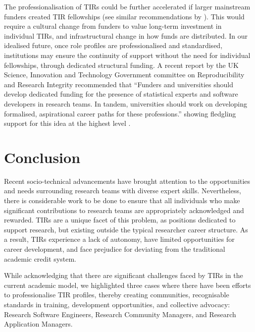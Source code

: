 \documentclass[authordate,meta,issue]{jote-new-article}
\begin{document}
The professionalisation of TIRs could be further accelerated if larger mainstream funders created TIR fellowships (see similar recommendations by \textcites{Teperek2022}{UKRI-ResearchEngland2022}). This would require a cultural change from funders to value long-term investment in individual TIRs, and infrastructural change in how funds are distributed. In our idealised future, once role profiles are professionalised and standardised, institutions may ensure the continuity of support without the need for individual fellowships, through dedicated structural funding. A recent report by the UK Science, Innovation and Technology Government committee \parencites{Science2023} on Reproducibility and Research Integrity recommended that “Funders and universities should develop dedicated funding for the presence of statistical experts and software developers in research teams. In tandem, universities should work on developing formalised, aspirational career paths for these professions.” showing fledgling support for this idea at the highest level \parencites{Science2023}.



\section{Conclusion}



Recent socio-technical advancements have brought attention to the opportunities and needs surrounding research teams with diverse expert skills. Nevertheless, there is considerable work to be done to ensure that all individuals who make significant contributions to research teams are appropriately acknowledged and rewarded. TIRs are a unique facet of this problem, as positions dedicated to support research, but existing outside the typical researcher career structure. As a result, TIRs experience a lack of autonomy, have limited opportunities for career development, and face prejudice for deviating from the traditional academic credit system.







While acknowledging that there are significant challenges faced by TIRs in the current academic model, we highlighted three cases where there have been efforts to professionalise TIR profiles, thereby creating communities, recognisable standards in training, development opportunities, and collective advocacy: Research Software Engineers, Research Community Managers, and Research Application Managers.
\end{document}
